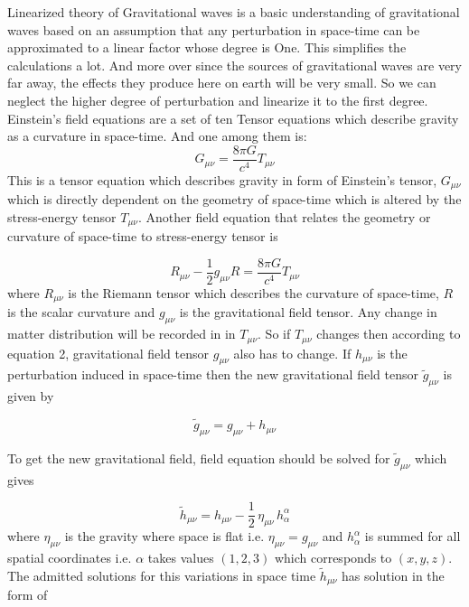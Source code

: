 Linearized theory of Gravitational waves is a basic understanding of gravitational waves based on an assumption that any perturbation in space-time can be approximated to a linear factor whose degree is One. This simplifies the calculations a lot. And more over since the sources of gravitational waves are very far away, the effects they produce here on earth will be very small. So we can neglect the higher degree of perturbation and linearize it to the first degree. \\

Einstein's field equations are a set of ten Tensor equations which describe gravity as a curvature in space-time. And one among them is: 
\begin{equation}
    G_{\mu\nu}= \frac{8 \pi  G}{c^{4}}  T_{\mu\nu}
\end{equation}
This is a tensor equation which describes gravity in form of Einstein's tensor, $G_{\mu\nu}$ which is directly dependent on the geometry of space-time which is altered by the stress-energy tensor $T_{\mu\nu}$. Another field equation that relates the geometry or curvature of space-time to stress-energy tensor is 

\begin{equation}
    R_{\mu\nu}-\frac{1}{2}g_{\mu\nu}R=\frac{8\pi G}{c^{4}}T_{\mu\nu}
\end{equation}
where $R_{\mu\nu}$ is the Riemann tensor which describes the curvature of space-time, $R$ is the scalar curvature and $g_{\mu\nu}$ is the gravitational field tensor. Any change in matter distribution will be recorded in in $T_{\mu\nu}$. So if $T_{\mu\nu}$ changes then according to equation 2, gravitational field tensor $g_{\mu\nu}$ also has to change. If $h_{\mu\nu}$ is the perturbation induced in space-time then the new gravitational field tensor $\tilde{g}_{\mu\nu}$ is given by 

\begin{equation}
    \tilde{g}_{\mu\nu} = g_{\mu\nu} + h_{\mu\nu}
\end{equation}

\noindent To get the new gravitational field, field equation should be solved for $\tilde{g}_{\mu\nu}$ which gives 

\begin{equation}
    \tilde{h}_{\mu\nu} = h_{\mu\nu} - \frac{1}{2} \, \eta_{\mu\nu} \, h^{\alpha}_{\alpha}
\end{equation}
 where $\eta_{\mu\nu}$ is the gravity where space is flat i.e. $\eta_{\mu\nu} = g_{\mu\nu}$ and $h^{\alpha}_{\alpha}$ is summed for all spatial coordinates i.e. $\alpha$ takes values $(1,2,3) $ which corresponds to $(x,y,z)$. The admitted solutions for this variations in space time $\tilde{h}_{\mu\nu}$ has solution in the form of 
 

